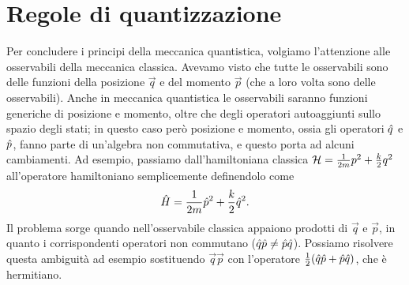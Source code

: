 \section{Regole di quantizzazione}
Per concludere i principi della meccanica quantistica, volgiamo l'attenzione alle osservabili della meccanica classica.
Avevamo visto che tutte le osservabili sono delle funzioni della posizione $\vec q$ e del momento $\vec p$ (che a loro volta sono delle osservabili).
Anche in meccanica quantistica le osservabili saranno funzioni generiche di posizione e momento, oltre che degli operatori autoaggiunti sullo spazio degli stati; in questo caso però posizione e momento, ossia gli operatori $\hat{q}$ e $\hat{p}$, fanno parte di un'algebra non commutativa, e questo porta ad alcuni cambiamenti.
Ad esempio, passiamo dall'hamiltoniana classica $\mathcal H=\frac1{2m}p^2+\frac{k}2q^2$ all'operatore hamiltoniano semplicemente definendolo come
\begin{equation}
	\hat{H}=\frac1{2m}\hat{p}^2+\frac{k}2\hat{q}^2.
	\label{eq:operatore-hamiltoniano}
\end{equation}
Il problema sorge quando nell'osservabile classica appaiono prodotti di $\vec q$ e $\vec p$, in quanto i corrispondenti operatori non commutano ($\hat{q}\hat{p}\neq\hat{p}\hat{q}$).
Possiamo risolvere questa ambiguità ad esempio sostituendo $\vec q\vec p$ con l'operatore $\frac12(\hat{q}\hat{p}+\hat{p}\hat{q})$, che è hermitiano.

